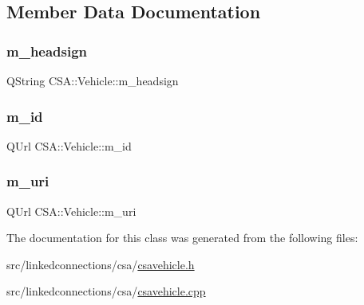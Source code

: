 \subsection{Member Data Documentation}
\mbox{\label{classCSA_1_1Vehicle_ab6764acaa95b5493b276e28a179952fd}} 
\subsubsection{\texorpdfstring{m\+\_\+headsign}{m\_headsign}}
{\footnotesize\ttfamily Q\+String C\+S\+A\+::\+Vehicle\+::m\+\_\+headsign\hspace{0.3cm}{\ttfamily [private]}}

\mbox{\label{classCSA_1_1Vehicle_ac1d751db24a92a8b38efae09d7759fc8}} 
\subsubsection{\texorpdfstring{m\+\_\+id}{m\_id}}
{\footnotesize\ttfamily Q\+Url C\+S\+A\+::\+Vehicle\+::m\+\_\+id\hspace{0.3cm}{\ttfamily [private]}}

\mbox{\label{classCSA_1_1Vehicle_a9ac31c6900099e172d8eae31f04849e4}} 
\subsubsection{\texorpdfstring{m\+\_\+uri}{m\_uri}}
{\footnotesize\ttfamily Q\+Url C\+S\+A\+::\+Vehicle\+::m\+\_\+uri\hspace{0.3cm}{\ttfamily [private]}}



The documentation for this class was generated from the following files\+:\begin{DoxyCompactItemize}
\item 
src/linkedconnections/csa/\mbox{\hyperlink{csavehicle_8h}{csavehicle.\+h}}\item 
src/linkedconnections/csa/\mbox{\hyperlink{csavehicle_8cpp}{csavehicle.\+cpp}}\end{DoxyCompactItemize}
